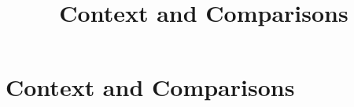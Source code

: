 \documentclass[../../OAE-SPEC-MAIN.tex]{subfiles}
\title{Context and Comparisons}
\begin{document}
\chapter{Context and Comparisons}



\clearpage

\clearpage

\clearpage

\clearpage

\end{document}
